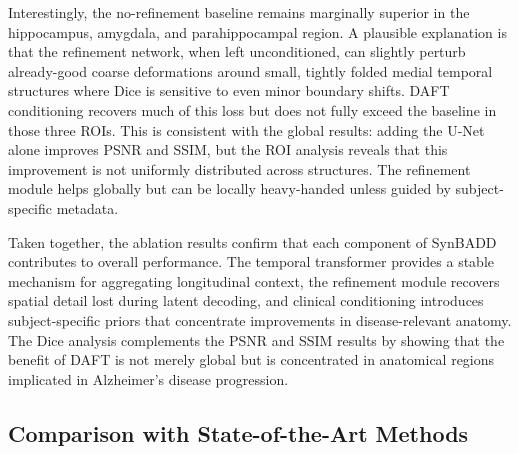 Interestingly, the no-refinement baseline remains marginally superior in the hippocampus, amygdala, and parahippocampal region. A plausible explanation is that the refinement network, when left unconditioned, can slightly perturb already-good coarse deformations around small, tightly folded medial temporal structures where Dice is sensitive to even minor boundary shifts. DAFT conditioning recovers much of this loss but does not fully exceed the baseline in those three ROIs. This is consistent with the global results: adding the U-Net alone improves PSNR and SSIM, but the ROI analysis reveals that this improvement is not uniformly distributed across structures. The refinement module helps globally but can be locally heavy-handed unless guided by subject-specific metadata.

Taken together, the ablation results confirm that each component of SynBADD contributes to overall performance. The temporal transformer provides a stable mechanism for aggregating longitudinal context, the refinement module recovers spatial detail lost during latent decoding, and clinical conditioning introduces subject-specific priors that concentrate improvements in disease-relevant anatomy. The Dice analysis complements the PSNR and SSIM results by showing that the benefit of DAFT is not merely global but is concentrated in anatomical regions implicated in Alzheimer's disease progression.

\subsection{Comparison with State-of-the-Art Methods}
\label{sec:sota}


